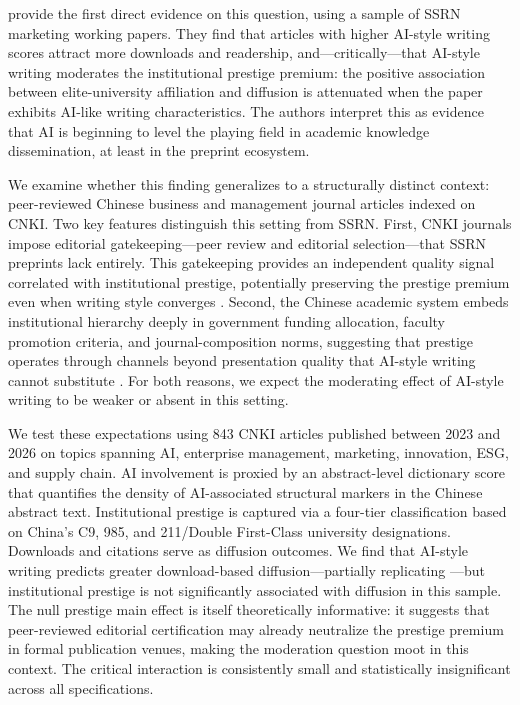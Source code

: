 \documentclass[12pt,a4paper]{article}
\begin{document}
\citet{JoLi2026} provide the first direct evidence on this question,
using a sample of SSRN marketing working papers.
They find that articles with higher AI-style writing scores attract
more downloads and readership, and---critically---that AI-style writing
moderates the institutional prestige premium: the positive association
between elite-university affiliation and diffusion is attenuated when
the paper exhibits AI-like writing characteristics.
The authors interpret this as evidence that AI is beginning to level
the playing field in academic knowledge dissemination, at least in the
preprint ecosystem.

We examine whether this finding generalizes to a structurally distinct
context: peer-reviewed Chinese business and management journal articles
indexed on CNKI.
Two key features distinguish this setting from SSRN.
First, CNKI journals impose editorial gatekeeping---peer review and
editorial selection---that SSRN preprints lack entirely.
This gatekeeping provides an independent quality signal correlated with
institutional prestige, potentially preserving the prestige premium
even when writing style converges \citep{Bornmann2008}.
Second, the Chinese academic system embeds institutional hierarchy
deeply in government funding allocation, faculty promotion criteria,
and journal-composition norms, suggesting that prestige operates
through channels beyond presentation quality that AI-style writing
cannot substitute \citep{DiMaggio1983,Long1979}.
For both reasons, we expect the moderating effect of AI-style writing
to be weaker or absent in this setting.

We test these expectations using 843 CNKI articles published between
2023 and 2026 on topics spanning AI, enterprise management, marketing,
innovation, ESG, and supply chain.
AI involvement is proxied by an abstract-level dictionary score that
quantifies the density of AI-associated structural markers in the
Chinese abstract text.
Institutional prestige is captured via a four-tier classification
based on China's C9, 985, and 211/Double First-Class university
designations.
Downloads and citations serve as diffusion outcomes.
We find that AI-style writing predicts greater download-based
diffusion---partially replicating \citet{JoLi2026}---but institutional
prestige is not significantly associated with diffusion in this sample.
The null prestige main effect is itself theoretically informative:
it suggests that peer-reviewed editorial certification may already
neutralize the prestige premium in formal publication venues, making
the moderation question moot in this context.
The critical interaction is consistently small and statistically
insignificant across all specifications.
\end{document}
